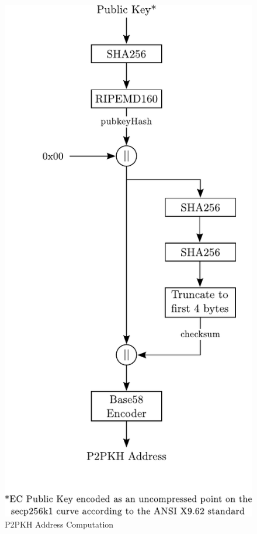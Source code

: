 \begin{figure}[htbp]

\centering
\includegraphics[scale=0.8]{images/BitcoinAddress-P2PKH.pdf}

\caption{P2PKH Address Computation}
\label{fig:BitcoinAddress-P2PKH}
\end{figure}
\vspace{-10pt}


